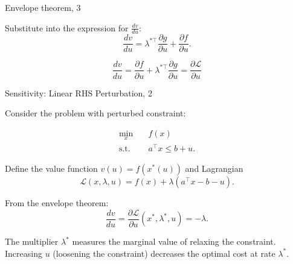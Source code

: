 \documentclass{beamer}
\begin{document}
\begin{frame}{Envelope theorem, 3}
	\begin{flushleft}
		
		Substitute into the expression for $\frac{dv}{du}$:
		\begin{equation}
			\frac{dv}{du}
			=
			\lambda^{*\top} \frac{\partial g}{\partial u}
			+
			\frac{\partial f}{\partial u}.
		\end{equation}
		
		
		\begin{equation}
			\boxed{
				\frac{dv}{du}
				=
				\frac{\partial f}{\partial u}
				+
				\lambda^{*\top} \frac{\partial g}{\partial u}
				=
				\frac{\partial \mathcal{L}}{\partial u}
			}
		\end{equation}
		
	\end{flushleft}
\end{frame}


\begin{frame}{Sensitivity: Linear RHS Perturbation, 2}
	\begin{flushleft}
		
		Consider the problem with perturbed constraint:
		
		\begin{equation*}
			\begin{aligned}
				\min_x \quad & f(x) \\
				\text{s.t.} \quad & a^\top x \le b + u.
			\end{aligned}
		\end{equation*}
		
		Define the value function $v(u) = f(x^*(u))$ and Lagrangian
		\begin{equation*}
			\mathcal{L}(x,\lambda,u) = f(x) + \lambda (a^\top x - b - u).
		\end{equation*}
		
		From the envelope theorem:
		\begin{equation*}
			\frac{dv}{du} = \frac{\partial \mathcal{L}}{\partial u}(x^*, \lambda^*, u) = -\lambda.
		\end{equation*}
		
		The multiplier $\lambda^*$ measures the marginal value of relaxing the constraint. Increasing $u$ (loosening the constraint) decreases the optimal cost at rate $\lambda^*$.
		
	\end{flushleft}
\end{frame}
\end{document}
